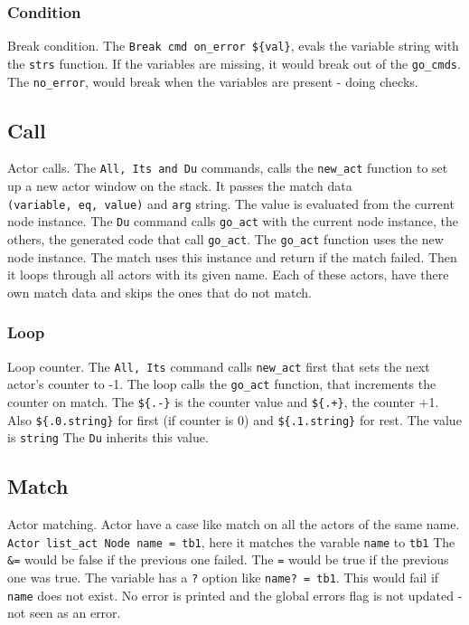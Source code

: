 \documentclass[11pt]{article}
\begin{document}
\subsubsection{Condition}
Break condition.
The \texttt{Break\ cmd\ on\_error\ \$\{val\}}, evals the variable string
with the \texttt{strs} function. If the variables are missing, it would
break out of the \texttt{go\_cmds}. The \texttt{no\_error}, would break
when the variables are present - doing checks.
\subsection{Call}
Actor calls.
The \texttt{All,\ Its\ and\ Du} commands, calls the \texttt{new\_act}
function to set up a new actor window on the stack. It passes the match
data \texttt{(variable,\ eq,\ value)} and \texttt{arg} string. The value
is evaluated from the current node instance. The \texttt{Du} command
calls \texttt{go\_act} with the current node instance, the others, the
generated code that call \texttt{go\_act}. The \texttt{go\_act} function
uses the new node instance. The match uses this instance and return if
the match failed. Then it loops through all actors with its given name.
Each of these actors, have there own match data and skips the ones that
do not match.
\subsubsection{Loop}
Loop counter.
The \texttt{All,\ Its} command calls \texttt{new\_act} first that sets
the next actor's counter to -1. The loop calls the \texttt{go\_act}
function, that increments the counter on match. The \texttt{\$\{.-\}} is
the counter value and \texttt{\$\{.+\}}, the counter +1. Also
\texttt{\$\{.0.string\}} for first (if counter is 0) and
\texttt{\$\{.1.string\}} for rest. The value is \texttt{string} The
\texttt{Du} inherits this value.
\subsection{Match}
Actor matching.
Actor have a case like match on all the actors of the same name.
\texttt{Actor\ list\_act\ Node\ name\ =\ tb1}, here it matches the
varable \texttt{name} to \texttt{tb1} The \texttt{\&=} would be false if
the previous one failed. The \texttt{\textbar{}=} would be true if the
previous one was true. The variable has a \texttt{?} option like
\texttt{name?\ =\ tb1}. This would fail if \texttt{name} does not exist.
No error is printed and the global errors flag is not updated - not seen
as an error.
\end{document}
